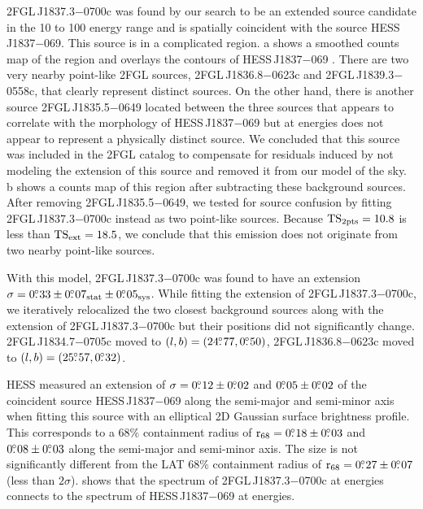 2FGL\,J1837.3$-$0700c was found by our search to be an extended source
candidate in the 10 \gev to 100 \gev energy range and is spatially
coincident with the \tev source HESS\,J1837$-$069.  This source is
in a complicated region.  a shows a
smoothed counts map of the region and overlays the \tev contours of
HESS\,J1837$-$069 \citep{aharonian_2006a_h.e.s.s.-survey}.  There are two very nearby
point-like 2FGL sources, 2FGL\,J1836.8$-$0623c and 2FGL\,J1839.3$-$0558c,
that clearly represent distinct sources.  On the other hand, there is
another source 2FGL\,J1835.5$-$0649 located between the three sources that
appears to correlate with the \tev morphology of HESS\,J1837$-$069 but
at \gev energies
does not appear to represent a physically distinct source.  We concluded
that this source was included in the 2FGL catalog to compensate for residuals induced by
not modeling the extension of this source and removed it from our model
of the sky.  b shows a
counts map of this region after subtracting these background sources.
After removing 2FGL\,J1835.5$-$0649,
we tested for
source confusion by fitting 
2FGL\,J1837.3$-$0700c
instead as two point-like sources.
Because $\mathrm{TS}_{\mathrm{2pts}}=10.8$ is less than $\mathrm{TS}_\mathrm{ext}=18.5$, we conclude that this emission
does not originate from two nearby point-like sources.

With this model, 2FGL\,J1837.3$-$0700c was found to have an
extension $\sigma=0\mbox{$.\!\!^\circ$}33\pm0\mbox{$.\!\!^\circ$}07_\text{stat}\pm0\mbox{$.\!\!^\circ$}05_\text{sys}$.
While fitting the extension of 2FGL\,J1837.3$-$0700c,
we iteratively relocalized the two closest
background sources along with the extension of 2FGL\,J1837.3$-$0700c but
their positions did not significantly change.  2FGL\,J1834.7$-$0705c
moved to $(l,b)=(24\mbox{$.\!\!^\circ$}77,0\mbox{$.\!\!^\circ$}50)$, 2FGL\,J1836.8$-$0623c moved
to $(l,b)=(25\mbox{$.\!\!^\circ$}57,0\mbox{$.\!\!^\circ$}32)$. 

\ac{HESS} measured an extension of
$\sigma=0\mbox{$.\!\!^\circ$}12\pm0\mbox{$.\!\!^\circ$}02$ and $0\mbox{$.\!\!^\circ$}05\pm0\mbox{$.\!\!^\circ$}02$ 
of the coincident \tev source HESS\,J1837$-$069 
along the semi-major and semi-minor axis when fitting this source
with an elliptical 2D Gaussian surface brightness profile.  This corresponds
to a 68\% containment radius of ${\mathrm{r}_{68}}=0\mbox{$.\!\!^\circ$}18\pm0\mbox{$.\!\!^\circ$}03$ and
$0\mbox{$.\!\!^\circ$}08\pm0\mbox{$.\!\!^\circ$}03$ along the semi-major and semi-minor axis. The
size is not significantly different from the LAT 68\% containment
radius of ${\mathrm{r}_{68}}=0\mbox{$.\!\!^\circ$}27\pm0\mbox{$.\!\!^\circ$}07$ (less than $2\sigma$).
 shows that the spectrum of 2FGL\,J1837.3$-$0700c
at \gev energies connects to the spectrum of HESS\,J1837$-$069 at \tev
energies.

